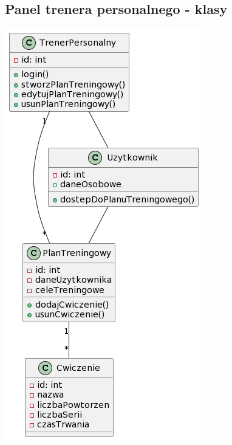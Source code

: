 \subsection{Panel trenera personalnego - klasy}\label{subsec:panel-trenera-personalnego-classes}

{\includegraphics{diagrams/class/trener_personalny_klasy}}